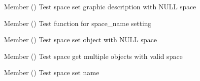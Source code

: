 \begin{DoxyRefList}
\item[Member \doxylink{space__test_8c_af40c7a664b529a39c3d98dca3d0af708}{test2\+\_\+space\+\_\+set\+\_\+gdesc} ()]\label{test__test000131}%
%
Test space set graphic description with NULL space  
\item[Member \doxylink{space__test_8c_a5a868ba017602ba6b58447cb394e81a6}{test2\+\_\+space\+\_\+set\+\_\+name} ()]\label{test__test000117}%
%
Test function for space\+\_\+name setting  
\item[Member \doxylink{space__test_8c_a6349e2b547c71dee23b96d8bbf7a1806}{test2\+\_\+space\+\_\+set\+\_\+object} ()]\label{test__test000120}%
%
Test space set object with NULL space  
\item[Member \doxylink{space__test_8c_a3fb76d2dce3ed1a0ce85228e2f7d1cab}{test3\+\_\+space\+\_\+multiple\+\_\+objects} ()]\label{test__test000129}%
%
Test space get multiple objects with valid space  
\item[Member \doxylink{space__test_8c_aa24a337830006e33706ab6ac1c416b47}{test3\+\_\+space\+\_\+set\+\_\+name} ()]\label{test__test000118}%
%
Test space set name 
\end{DoxyRefList}